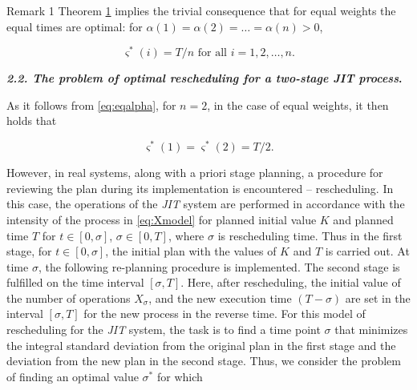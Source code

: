 \smallskip






\begin{newthm}{Remark 1} Theorem \hyperlink{b:Th1}{1} implies the trivial consequence that for equal weights the equal times are optimal: for $\alpha(1) = \alpha(2) = … = \alpha(n) > 0$,

\begin{equation}\label{eq:eqalpha}

{{\varsigma}^*}(i) = T / n \text { for all $i=1, 2, \dotsc , n$}.

\end{equation}

\end{newthm}



\smallskip






\hypertarget{b:2.2}{}



\textbf{\emph{2.2. The problem of optimal rescheduling for a two-stage {JIT} process}.}

	As it follows from \eqref{eq:eqalpha}, for $n = 2$, in the case of equal weights, it then holds that

\begin{equation}\label{eq:vars}

{{\varsigma}^*}(1) ={{\varsigma}^*}(2) = T / 2.

\end{equation}

However, in real systems, along with a priori stage planning, a procedure for reviewing the plan during its implementation is encountered – rescheduling.  In this case, the operations of the \emph{JIT} system are performed in accordance with the intensity of the process in \eqref{eq:Xmodel} for planned initial value $K$ and planned time $T$ for $t \in [0, \sigma]$, $\sigma \in [0, T]$, where $\sigma$ is rescheduling time. Thus in the first stage, for $t \in [0, \sigma]$, the initial plan with the values of $K$ and $T$ is carried out. At time $\sigma$, the following re-planning procedure is implemented. The second stage is fulfilled on the time interval $[\sigma, T]$. Here, after rescheduling, the initial value of the number of operations $X_{\sigma}$, and the new execution time $(T - \sigma )$ are set in the interval $[\sigma, T]$ for the new process in the reverse time. For this model of rescheduling for the \emph{JIT} system, the task is to find a time point $\sigma$ that minimizes the integral standard deviation from the original plan in the first stage and the deviation from the new plan in the second stage. Thus, we consider the problem of finding an optimal value ${\sigma}^*$ for which 

